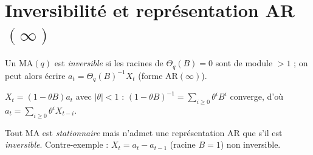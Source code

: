 \documentclass[11pt]{report}
\begin{document}
\section{Inversibilité et représentation AR$(\infty)$}
\begin{definition}[Inversibilité]
Un MA$(q)$ est \emph{inversible} si les racines de $\Theta_q(B)=0$ sont de module $>1$ ; on
peut alors écrire $a_t=\Theta_q(B)^{-1}X_t$ (forme $\mathrm{AR}(\infty)$).
\end{definition}
\begin{exemple}
$X_t=(1-\theta B)a_t$ avec $|\theta|<1$ : $(1-\theta B)^{-1}=\sum_{i\ge0}\theta^iB^i$ converge,
d'où $a_t=\sum_{i\ge0}\theta^iX_{t-i}$.
\end{exemple}
\begin{attention}[$\to$ Q\,A.12]
Tout MA est \emph{stationnaire} mais n'admet une représentation AR que s'il est
\emph{inversible}. Contre-exemple : $X_t=a_t-a_{t-1}$ (racine $B=1$) non inversible.
\end{attention}
\end{document}
